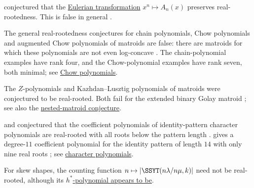  conjectured that the
\hyperref[eulerianTransformation]{Eulerian transformation}
$x^n\mapsto A_n(x)$ preserves real-rootedness.  This is false in general
\cite{BrandenJochemko2022}.

The general real-rootedness conjectures for chain polynomials, Chow
polynomials and augmented Chow polynomials of matroids are false: there are
matroids for which these polynomials are not even log-concave
\cite[Thms.~A--C]{BercziCoronEurLi2026x}.  The chain-polynomial examples
have rank four, and the Chow-polynomial examples have rank seven, both
minimal; see \hyperref[realRootsChow]{Chow polynomials}.

The $Z$-polynomials \cite{ProudfootXuYoung2018} and Kazhdan--Lusztig
polynomials of matroids were conjectured to be real-rooted.  Both fail for the
extended binary Golay matroid \cite{Eberhardt2026x}; see also the
\hyperref[conjNestedMatroidZ]{nested-matroid conjecture}.

 and  conjectured that the
coefficient polynomials of identity-pattern character polynomials are
real-rooted with all roots below the pattern length
\cite[Conj.~1.4]{GaetzPierson2022x}.   gives a
degree-$11$ coefficient polynomial for the identity pattern of length $14$
with only nine real roots \cite[Ex.~1.1]{Iskander2023x}; see
\hyperref[characterSymmetricFunctions]{character polynomials}.

For skew shapes, the counting function
$n\mapsto|\SSYT(n\lambda/n\mu,k)|$ need not be real-rooted, although its
\hyperref[conjSkewSchurHStar]{$h^*$-polynomial appears to be}.
